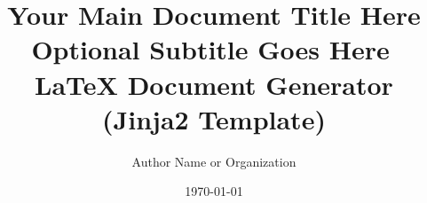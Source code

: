 \documentclass[a4paper,11pt]{article}
\title{Your Main Document Title Here\\[0.3em]Optional Subtitle Goes Here}
\author{Author Name or Organization}
\date{\today} %
\begin{document}
\title{📝 LaTeX Document Generator (Jinja2 Template)}
\end{document}
